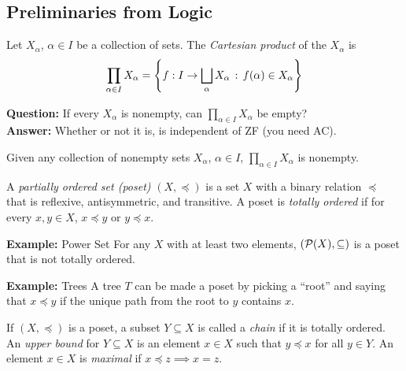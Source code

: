 
\subsection*{Preliminaries from Logic}
\sectionspace

\begin{definition}
    Let $X_{\alpha}$, $\alpha \in I$ be a collection of sets. The \emph{Cartesian product} of the $X_{\alpha}$ is
    \[ \prod_{\alpha \in I} X_{\alpha} = \left\{f : I \to \bigsqcup_{\alpha} X_{\alpha} \col f(\alpha) \in X_{\alpha}\right\} \]
\end{definition}

\textbf{Question:} If every $X_{\alpha}$ is nonempty, can $\prod_{\alpha \in I} X_{\alpha}$ be empty?\\

\textbf{Answer:} Whether or not it is, is independent of ZF (you need AC).

\begin{theorem}
    Given any collection of nonempty sets $X_{\alpha}$, $\alpha \in I$, $\prod_{\alpha \in I} X_{\alpha}$ is nonempty.
\end{theorem}

\begin{definition}
    A \emph{partially ordered set (poset)} $(X, \preceq)$ is a set $X$ with a binary relation $\preceq$ that is reflexive, antisymmetric, and transitive. A poset is \emph{totally ordered} if for every $x, y \in X$, $x \preceq y$ or $y \preceq x$.
\end{definition}

\begin{example}{\textbf{Example:} Power Set}
    For any $X$ with at least two elements, $(\P(X), \subseteq)$ is a poset that is not totally ordered.
\end{example}

\begin{example}{\textbf{Example:} Trees}
    A tree $T$ can be made a poset by picking a ``root'' and saying that $x \preceq y$ if the unique path from the root to $y$ contains $x$.
\end{example}

\begin{definition}
    If $(X, \preceq)$ is a poset, a subset $Y \subseteq X$ is called a \emph{chain} if it is totally ordered. An \emph{upper bound} for $Y \subseteq X$ is an element $x \in X$ such that $y \preceq x$ for all $y \in Y$. An element $x \in X$ is \emph{maximal} if $x \preceq z \implies x = z$.
\end{definition}

